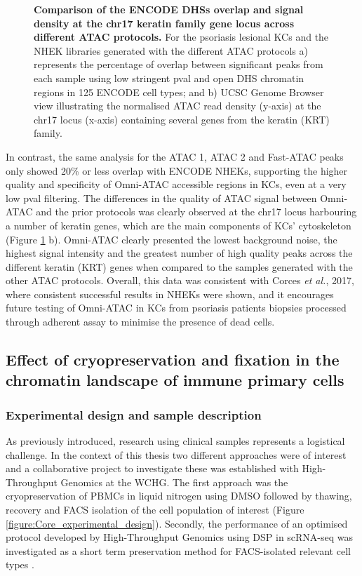 \begin{figure}[htbp]
\begin{subfigure}{0.5\textwidth}
\caption{\textbf{}}
\end{subfigure}
\caption[Comparison of the ENCODE DHSs overlap and signal density at the chr17 keratin family gene locus across different ATAC protocols.]{\textbf{Comparison of the ENCODE DHSs overlap and signal density at the chr17 keratin family gene locus across different ATAC protocols.} For the psoriasis lesional KCs and the NHEK libraries generated with the different ATAC protocols a) represents the percentage of overlap between significant peaks from each sample using low stringent pval and open DHS chromatin regions in 125 ENCODE cell types; and  b) UCSC Genome Browser view illustrating the normalised ATAC read density (y-axis) at the chr17 locus (x-axis) containing several genes from the keratin (KRT) family.}
\label{figure:ATAC_skin_ENCODE_overlap_and_tracks}
\end{figure} 

In contrast, the same analysis for the ATAC 1, ATAC 2 and Fast-ATAC peaks only showed 20\% or less overlap with ENCODE NHEKs, supporting the higher quality and specificity of Omni-ATAC accessible regions in KCs, even at a very low pval filtering. The differences in the quality of ATAC signal between Omni-ATAC and the prior protocols was clearly observed at the chr17 locus harbouring a number of keratin genes, which are the main components of KCs' cytoskeleton (Figure \ref{figure:ATAC_skin_ENCODE_overlap_and_tracks} b). Omni-ATAC clearly presented the lowest background noise, the highest signal intensity and the greatest number of high quality peaks across the different keratin (KRT) genes when compared to the samples generated with the other ATAC protocols. Overall, this data was consistent with Corces \textit{et al.}, 2017, where consistent successful results in NHEKs were shown, and it encourages future testing of Omni-ATAC in KCs from psoriasis patients biopsies processed through adherent assay to minimise the presence of dead cells.


\subsection{Effect of cryopreservation and fixation in the chromatin landscape of immune primary cells}
\label{Core}
\subsubsection{Experimental design and sample description}
As previously introduced, research using clinical samples represents a logistical challenge. In the context of this thesis two different approaches were of interest and a collaborative project to investigate these was established with High-Throughput Genomics at the WCHG. The first approach was the cryopreservation of PBMCs in liquid nitrogen using DMSO followed by thawing, recovery and FACS isolation of the cell population of interest (Figure \ref{figure:Core_experimental_design}). Secondly, the performance of an optimised protocol developed by High-Throughput Genomics using DSP in scRNA-seq \parencite{Attar2018} was investigated as a short term preservation method for FACS-isolated relevant cell types .


